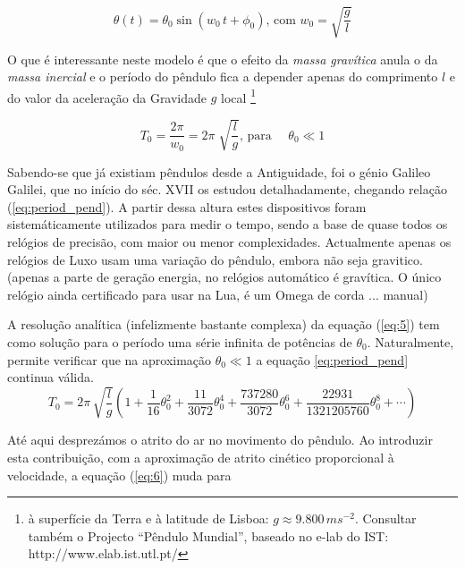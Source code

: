 \documentclass[a4paper,twoside,12pt]{article}      %
\begin{document}
\begin{equation}
	\label{eq:solu_pend}
\theta (t) = \theta_0 \sin(w_0 \, t + \phi_0) \text{, com } w_0 = \sqrt{\frac{g}{l}}
\end{equation}

O que é interessante neste modelo é que o efeito da \emph{massa gravítica } anula o da \emph{massa inercial } e o período do pêndulo fica a  depender apenas do comprimento $l$  e do valor da aceleração da Gravidade $g$  local 
\footnote{à superfície da Terra e à latitude de Lisboa: $g\approx 9.800\,m s^{-2}$. Consultar também o Projecto ``Pêndulo Mundial'', baseado no e-lab do IST: http://www.elab.ist.utl.pt/}

\begin{equation}
	\label{eq:period_pend}
T_0 = \frac{2 \pi}{w_0} = 2\pi\; \sqrt{\frac{l}{g}} \text{, para }	\quad \theta_0 \ll 1
\end{equation}

Sabendo-se que já existiam pêndulos  desde a Antiguidade, foi o génio  Galileo Galilei, que no início do séc. XVII os estudou detalhadamente, chegando relação (\ref{eq:period_pend}).
A partir dessa altura
estes dispositivos foram sistemáticamente utilizados para medir o tempo, sendo a base 
de quase todos os relógios de precisão, com maior ou menor complexidades.
Actualmente apenas os relógios de Luxo usam uma variação do pêndulo, embora não seja gravitico.
(apenas a parte de geração energia, no relógios automático é gravítica. 
O único relógio ainda certificado para usar na Lua,
é um Omega de corda ... manual)

A resolução analítica (infelizmente bastante complexa) da equação 	(\ref{eq:5})  tem como solução para o período uma série  infinita de potências de $\theta_0$. 
Naturalmente, permite verificar que na aproximação $\theta_0 \ll 1$ a equação \ref{eq:period_pend} continua válida.
\begin{equation}
	\label{eq:period_pend_exa}
T_0 =  2\pi\, \sqrt{\frac{l}{g}} \left(1 + \frac{1}{16} \theta_0^{2} + \frac{11}{3072} \theta_0^{4} +
 \frac{737280}{3072} \theta_0^{6} + \frac{22931}{1321205760} \theta_0^{8} + \cdots \right)
\end{equation}

Até aqui desprezámos o atrito do ar no movimento do pêndulo. Ao introduzir esta contribuição, com a aproximação de atrito cinético 
proporcional à velocidade, a  equação	(\ref{eq:6}) muda para
\end{document}
